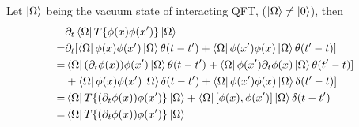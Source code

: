Let $\ket{\Omega}$ being the vacuum state of interacting QFT, ($\ket{\Omega} \neq \ket{0}$), then
\[
    \begin{aligned}
	&\partial_t\bra{\Omega}T\{\phi(x)\phi(x')\}\ket{\Omega}	    \\
	=& \partial_t[\bra{\Omega}\phi(x)\phi(x')\ket{\Omega}\theta(t-t') + \bra{\Omega}\phi(x')\phi(x)\ket{\Omega}\theta(t'-t)]   \\
	=& \bra{\Omega}(\partial_t\phi(x))\phi(x')\ket{\Omega}\theta(t-t') + \bra{\Omega}\phi(x')\partial_t\phi(x)\ket{\Omega}\theta(t'-t)]   \\
	&+ \bra{\Omega}\phi(x)\phi(x')\ket{\Omega}\delta(t-t') + \bra{\Omega}\phi(x')\phi(x)\ket{\Omega}\delta(t'-t)]   \\
	=& \bra{\Omega}T\{(\partial_t\phi(x))\phi(x')\}\ket{\Omega} + \bra{\Omega}[\phi(x), \phi(x')]\ket{\Omega}\delta(t-t')	\\
	=& \bra{\Omega}T\{(\partial_t\phi(x))\phi(x')\}\ket{\Omega} \\
    \end{aligned}
    \]

